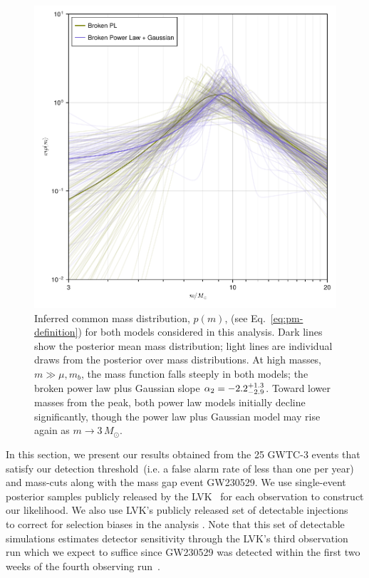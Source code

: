 \documentclass[modern]{aastex631}
\begin{document}
\begin{figure}
    \includegraphics[width=\columnwidth]{figures/pm_traces_including_230529.pdf}
    \caption{\label{fig:pm-traces_including_230529} Inferred common mass
    distribution, $p(m)$, (see Eq.~\eqref{eq:pm-definition}) for both models
    considered in this analysis.  Dark lines show the posterior mean mass
    distribution; light lines are individual draws from the posterior over mass
    distributions.  At high masses, $m \gg \mu, m_b$, the mass function falls
    steeply in both models; the broken power law plus Gaussian slope $\alpha_2 =
    -2.2^{+1.3}_{-2.9}$. Toward lower masses from the peak, both power law models
    initially decline significantly, though the power law plus Gaussian model
    may rise again as $m \to 3 \, M_\odot$.}
\end{figure}

In this section, we present our results obtained from the 25 GWTC-3 events that
satisfy our detection threshold~(i.e. a false alarm rate of less than one per
year) and mass-cuts along with the mass gap event GW230529. We use single-event
posterior samples publicly released by the LVK~\citep{gwosco3, gwosco4} for each
observation to construct our likelihood. We also use LVK's publicly released set
of detectable injections~\citep{gwosco3} to correct for selection biases in the
analysis \citep{Mandel:2018mve}. Note that this set of detectable simulations
estimates detector sensitivity through the LVK's third observation run which we
expect to suffice since GW230529 was detected within the first two weeks of the
fourth observing run~\citep{LIGOScientific:2024elc}.
\end{document}
